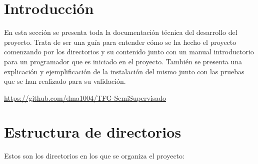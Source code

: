 
\section{Introducción}
En esta sección se presenta toda la documentación técnica del desarrollo del
proyecto. Trata de ser una guía para entender cómo se ha hecho el proyecto
comenzando por los directorios y su contenido junto con un manual introductorio
para un programador que es iniciado en el proyecto. También se presenta una
explicación y ejemplificación de la instalación del mismo junto con las pruebas
que se han realizado para su validación.

\begin{tcolorbox}[enhanced,title=Repositorio Github,
frame style={left color=blue!75!black,
right color=cyan!75!black}]
\url{https://github.com/dma1004/TFG-SemiSupervisado}
\end{tcolorbox}

\section{Estructura de directorios}
Estos son los directorios en los que se organiza el proyecto:

